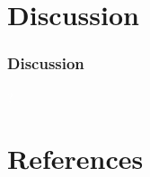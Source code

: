 \documentclass[xcolor=dvipsnames]{beamer}
\begin{document}
\section{Discussion}
{ 
\begin{frame}
	\frametitle{Discussion}
	\begin{center}
		{\fontsize{120}{48} \selectfont \textcolor{white}{?}}
	\end{center}
\end{frame}}

\section{References}
\begin{frame}[t,allowframebreaks]
	\nocite{*}
	\printbibliography
\end{frame}
\end{document}
